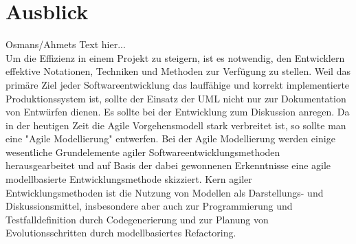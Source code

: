 \chapter{Ausblick}

Osmans/Ahmets Text hier...
\\
Um die Effizienz in einem Projekt zu steigern, ist es notwendig, den Entwicklern effektive Notationen, Techniken und Methoden zur Verfügung zu stellen. Weil das primäre Ziel jeder Softwareentwicklung das lauffähige und korrekt implementierte Produktionssystem ist, sollte der Einsatz der UML nicht nur zur Dokumentation von Entwürfen dienen. Es sollte bei der Entwicklung zum Diskussion anregen. Da in der heutigen Zeit die Agile Vorgehensmodell stark verbreitet ist, so sollte man eine "Agile Modellierung" entwerfen. Bei der Agile Modellierung werden einige wesentliche Grundelemente agiler Softwareentwicklungsmethoden herausgearbeitet und auf Basis der dabei gewonnenen Erkenntnisse eine agile modellbasierte Entwicklungsmethode skizziert. Kern agiler Entwicklungsmethoden ist die Nutzung von Modellen als Darstellungs- und Diskussionsmittel, insbesondere aber auch zur Programmierung und Testfalldefinition durch Codegenerierung und zur Planung von Evolutionsschritten durch modellbasiertes Refactoring.